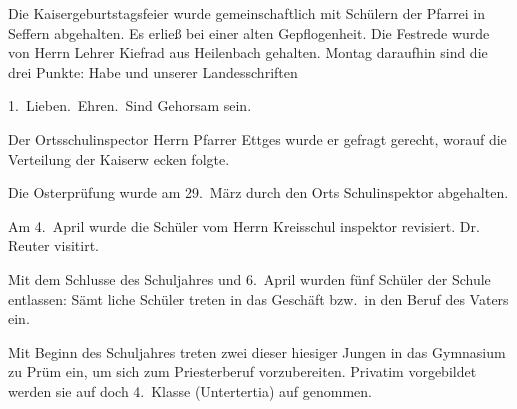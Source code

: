 

\pstart
Die Kaisergeburtstagsfeier wurde gemeinschaftlich mit\ob
Schülern der Pfarrei in Seffern abgehalten. Es erließ\ob
bei einer alten Gepflogenheit. Die Festrede wurde von\ob
Herrn Lehrer Kiefrad aus Heilenbach gehalten.\ob
Montag daraufhin sind die drei Punkte: Habe\ob
und unserer Landesschriften

1.\ Lieben.\ Ehren.\ Sind Gehorsam sein.

Der Ortsschulinspector Herrn Pfarrer Ettges wurde
er gefragt gerecht, worauf die Verteilung der Kaiserw\ohb
ecken folgte.

\pend
{}
\pstart

Die Osterprüfung wurde am 29.\ März durch den Orts\ohb
Schulinspektor abgehalten.

Am 4.\ April wurde die Schüler vom Herrn Kreisschul\ohb
inspektor revisiert. Dr. Reuter visitirt.

Mit dem Schlusse des Schuljahres und 6.\ April\ob
wurden fünf Schüler der Schule entlassen: Sämt\ohb
liche Schüler treten in das Geschäft bzw.\ in den\ob
Beruf des Vaters ein.

Mit Beginn des Schuljahres treten zwei dieser hiesiger\ob
Jungen in das Gymnasium zu Prüm ein, um sich\ob
zum Priesterberuf vorzubereiten. Privatim vorgebildet\ob
werden sie auf doch 4.\ Klasse (Untertertia) auf\ohb
genommen.
\pend
